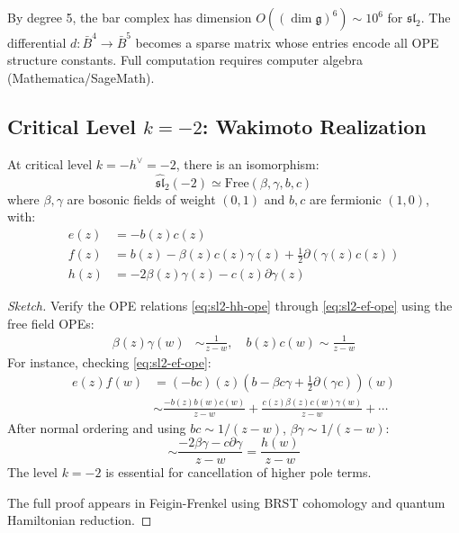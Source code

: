 \begin{remark}
By degree 5, the bar complex has dimension $O((\dim \mathfrak{g})^6) \sim 10^6$ for $\mathfrak{sl}_2$. The differential $d: \bar{B}^4 \to \bar{B}^5$ becomes a sparse matrix whose entries encode all OPE structure constants. Full computation requires computer algebra (Mathematica/SageMath).
\end{remark}

\subsection{Critical Level $k = -2$: Wakimoto Realization}

\begin{theorem}
\label{thm:wakimoto-sl2}
At critical level $k = -h^\vee = -2$, there is an isomorphism:
$$\widehat{\mathfrak{sl}}_2(-2) \simeq \text{Free}(\beta, \gamma, b, c)$$
where $\beta, \gamma$ are bosonic fields of weight $(0,1)$ and $b, c$ are fermionic $(1, 0)$, with:
\begin{align*}
e(z) &= -b(z)c(z) \\
f(z) &= b(z) - \beta(z)c(z)\gamma(z) + \frac{1}{2}\partial(\gamma(z)c(z)) \\
h(z) &= -2\beta(z)\gamma(z) - c(z)\partial\gamma(z)
\end{align*}
\end{theorem}

\begin{proof}[Sketch]
Verify the OPE relations \eqref{eq:sl2-hh-ope} through \eqref{eq:sl2-ef-ope} using the free field OPEs:
\begin{align*}
\beta(z)\gamma(w) &\sim \frac{1}{z-w}, \quad b(z)c(w) \sim \frac{1}{z-w}
\end{align*}
For instance, checking \eqref{eq:sl2-ef-ope}:
\begin{align*}
e(z)f(w) &= (-bc)(z) \left(b - \beta c\gamma + \frac{1}{2}\partial(\gamma c)\right)(w) \\
&\sim \frac{-b(z)b(w)c(w)}{z-w} + \frac{c(z)\beta(z)c(w)\gamma(w)}{z-w} + \cdots
\end{align*}
After normal ordering and using $bc \sim 1/(z-w)$, $\beta\gamma \sim 1/(z-w)$:
$$\sim \frac{-2\beta\gamma - c\partial\gamma}{z-w} = \frac{h(w)}{z-w}$$
The level $k=-2$ is essential for cancellation of higher pole terms.

The full proof appears in Feigin-Frenkel \cite{FF-wakimoto} using BRST cohomology and quantum Hamiltonian reduction.
\end{proof}

